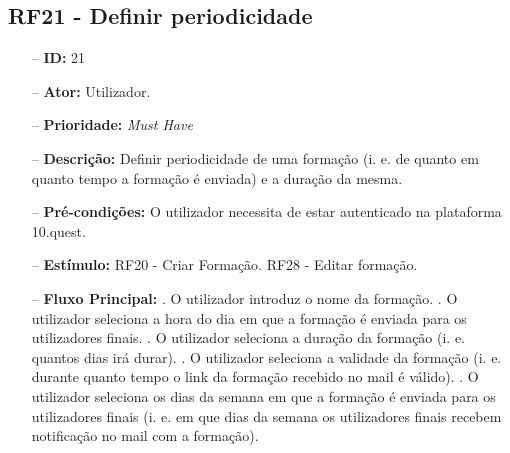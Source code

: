 \subsection{RF21 - Definir periodicidade}
\begin{itemize}
	\item[--] \textbf{ID:} 21
	\item[--]  \textbf{Ator:} Utilizador.
	\item[--]  \textbf{Prioridade:} \textit{Must Have}
	\item[--]  \textbf{Descrição:} Definir periodicidade de uma formação (i. e. de quanto em quanto tempo a formação é enviada) e a duração da mesma.
	\item[--]  \textbf{Pré-condições:} O utilizador necessita de estar autenticado na plataforma 10.quest.
	\item[--]  \textbf{Estímulo:}
		\subitem RF20 - Criar Formação.
		\subitem RF28 - Editar formação.
	\item[--]  \textbf{Fluxo Principal:} 
		. O utilizador introduz o nome da formação.
		. O utilizador seleciona a hora do dia em que a formação é enviada para os utilizadores finais.
		. O utilizador seleciona a duração da formação (i. e. quantos dias irá durar).
		. O utilizador seleciona a validade da formação (i. e. durante quanto tempo o link da formação recebido no mail é válido).
		. O utilizador seleciona os dias da semana em que a formação é enviada para os utilizadores finais (i. e. em que dias da semana os utilizadores finais recebem notificação no mail com a formação).
\end{itemize}
\newpage


